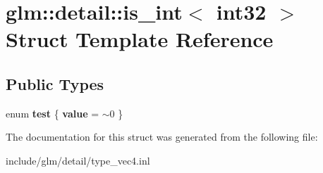 \hypertarget{structglm_1_1detail_1_1is__int_3_01int32_01_4}{}\section{glm\+:\+:detail\+:\+:is\+\_\+int$<$ int32 $>$ Struct Template Reference}
\label{structglm_1_1detail_1_1is__int_3_01int32_01_4}
\subsection*{Public Types}
\begin{DoxyCompactItemize}
\item 
\mbox{\label{structglm_1_1detail_1_1is__int_3_01int32_01_4_ad400146c56b42f07c8c14c71c5f7322f}} 
enum {\bfseries test} \{ {\bfseries value} = $\sim$0
 \}
\end{DoxyCompactItemize}


The documentation for this struct was generated from the following file\+:\begin{DoxyCompactItemize}
\item 
include/glm/detail/type\+\_\+vec4.\+inl\end{DoxyCompactItemize}
